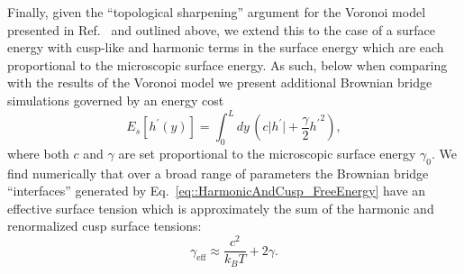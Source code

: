 \documentclass[twoside,twocolumn,9pt]{article}
\begin{document}
Finally, given the ``topological sharpening'' argument for the Voronoi model presented in Ref.~\cite{sussman2018soft} and outlined above, we extend this to the case of a surface energy with cusp-like and harmonic terms in the surface energy which are each proportional to the microscopic surface energy. As such, below when comparing with the results of the Voronoi model we present additional Brownian bridge simulations governed by an energy cost 
\begin{equation}
    \label{eq::HarmonicAndCusp_FreeEnergy}
    E_s[{h}^{\prime}(y)] = \int_{0}^{L}dy\, \left(c\big|h^{\prime}\big| + \frac{\gamma}{2}{h^{\prime}}^{2}\right),
\end{equation}
where both $c$ and $\gamma$ are set proportional to the microscopic surface energy $\gamma_0$. We find numerically that over a broad range of parameters the Brownian bridge ``interfaces'' generated by Eq.~\ref{eq::HarmonicAndCusp_FreeEnergy} have an effective surface tension which is approximately the sum of the harmonic and renormalized cusp surface tensions:
\begin{equation}
    \label{eq:harmonicAndCuspSurfaceTension}
    \gamma_{\text{eff}} \approx \frac{c^{2}}{k_{B}T} + 2\gamma.
\end{equation}
\end{document}
